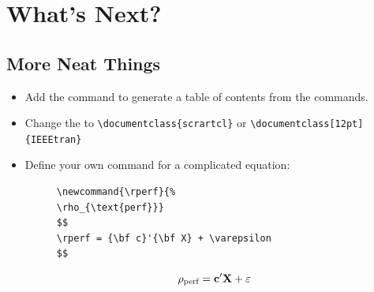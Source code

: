 \documentclass[aspectratio=169]{beamer}
\begin{document}

\section{What's Next?}


\subsection{More Neat Things}
\begin{frame}[fragile]{\insertsubsection}
\begin{itemize}
\item Add the  command to generate a table of contents
from the  commands.

\item Change the  to
\verb|\documentclass{scrartcl}|
or
\verb|\documentclass[12pt]{IEEEtran}|

\item Define your own command for a complicated equation:
\begin{figure}
    \begin{minipage}{0.5\textwidth}
        \begin{lstlisting}          
\newcommand{\rperf}{%
\rho_{\text{perf}}}
$$
\rperf = {\bf c}'{\bf X} + \varepsilon
$$
        \end{lstlisting}
    \end{minipage}
    \begin{minipage}{0.4\textwidth}      
\newcommand{\rperf}{%
\rho_{\text{perf}}}
$$
\rperf = {\bf c}'{\bf X} + \varepsilon
$$
    \end{minipage}
\end{figure}
\end{itemize}
\end{frame}
\end{document}
